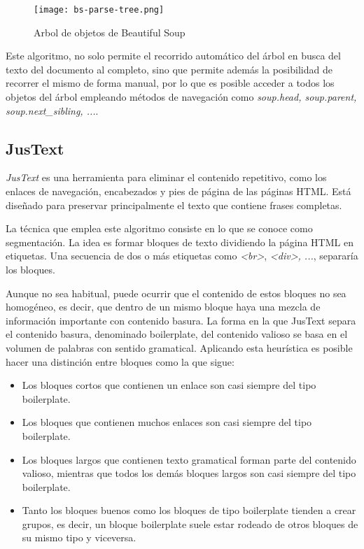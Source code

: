 \begin{figure}[tphb]
  \centering
  \texttt{[image: bs-parse-tree.png]}
  \caption{Arbol de objetos de Beautiful Soup\cite{bs-parse-tree}}
  \label{img:arbol de objetos de beautiful soup}
\end{figure}

Este algoritmo, no solo permite el recorrido automático del árbol en busca del texto del documento al
completo, sino que permite además la posibilidad de recorrer el mismo de forma manual, por lo que es posible
acceder a todos los objetos del árbol empleando métodos de navegación como \emph{soup.head, soup.parent,
soup.next\_sibling, ...}.

\subsection{JusText}
\label{subsec:justext}

\emph{JusText} \cite{justext} es una herramienta para eliminar el contenido repetitivo, como los enlaces 
de navegación, encabezados y pies de página de las páginas HTML. Está diseñado para preservar principalmente 
el texto que contiene frases completas.

La técnica que emplea este algoritmo consiste en lo que se conoce como segmentación. La idea es formar 
bloques de texto dividiendo la página HTML en etiquetas. Una secuencia de dos o más etiquetas como 
\emph{<br>}, \emph{<div>, ...}, separaría los bloques. 

Aunque no sea habitual, puede ocurrir que el contenido de estos bloques no sea homogéneo, es decir, que 
dentro de un mismo bloque haya una mezcla de información importante con contenido basura. La forma en la 
que JusText separa el contenido basura, denominado boilerplate, del contenido valioso se basa en el volumen 
de palabras con sentido gramatical. Aplicando esta heurística es posible hacer una distinción entre bloques 
como la que sigue:

\begin{itemize}
  \item Los bloques cortos que contienen un enlace son casi siempre del tipo boilerplate.
  \item Los bloques que contienen muchos enlaces son casi siempre del tipo boilerplate.
  \item Los bloques largos que contienen texto gramatical forman parte del contenido valioso, mientras que 
  todos los demás bloques largos son casi siempre del tipo boilerplate.
  \item Tanto los bloques buenos como los bloques de tipo boilerplate tienden a crear grupos, es decir,
  un bloque boilerplate suele estar rodeado de otros bloques de su mismo tipo y viceversa.
\end{itemize}

